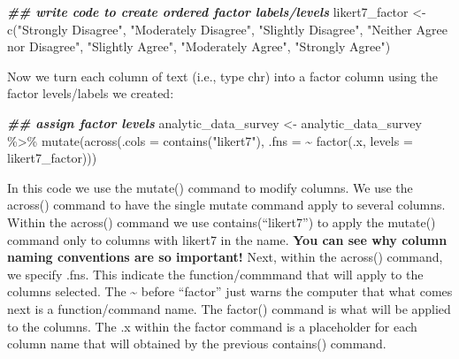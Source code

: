 \documentclass[
]{krantz}
\makeatletter
\newenvironment{Shaded}{\begin{snugshade}}{\end{snugshade}}
\newcommand{\AttributeTok}[1]{\textcolor[rgb]{0.61,0.61,0.61}{#1}}
\newcommand{\DocumentationTok}[1]{\textcolor[rgb]{0.37,0.37,0.37}{\textbf{\textit{#1}}}}
\newcommand{\FunctionTok}[1]{\textcolor[rgb]{0,0,0}{#1}}
\newcommand{\NormalTok}[1]{#1}
\newcommand{\OtherTok}[1]{\textcolor[rgb]{0.37,0.37,0.37}{#1}}
\newcommand{\SpecialCharTok}[1]{\textcolor[rgb]{0,0,0}{#1}}
\newcommand{\StringTok}[1]{\textcolor[rgb]{0.5,0.5,0.5}{#1}}
\newenvironment{kframe}{%
\medskip{}
\setlength{\fboxsep}{.8em}
 \def\at@end@of@kframe{}%
 \ifinner\ifhmode%
  \def\at@end@of@kframe{\end{minipage}}%
  \begin{minipage}{\columnwidth}%
 \fi\fi%
 \def\FrameCommand##1{\hskip\@totalleftmargin \hskip-\fboxsep
 \colorbox{shadecolor}{##1}\hskip-\fboxsep
     \hskip-\linewidth \hskip-\@totalleftmargin \hskip\columnwidth}%
 \MakeFramed {\advance\hsize-\width
   \@totalleftmargin\z@ \linewidth\hsize
   \@setminipage}}%
 {\par\unskip\endMakeFramed%
 \at@end@of@kframe}
\renewenvironment{Shaded}{\begin{kframe}}{\end{kframe}}
\makeatother
\begin{document}
\begin{Shaded}
\begin{Highlighting}[]
\DocumentationTok{\#\# write code to create ordered factor labels/levels}
\NormalTok{likert7\_factor }\OtherTok{\textless{}{-}} \FunctionTok{c}\NormalTok{(}\StringTok{"Strongly Disagree"}\NormalTok{,}
                    \StringTok{"Moderately Disagree"}\NormalTok{,}
                    \StringTok{"Slightly Disagree"}\NormalTok{,}
                    \StringTok{"Neither Agree nor Disagree"}\NormalTok{,}
                    \StringTok{"Slightly Agree"}\NormalTok{,}
                    \StringTok{"Moderately Agree"}\NormalTok{,}
                    \StringTok{"Strongly Agree"}\NormalTok{)}
\end{Highlighting}
\end{Shaded}

Now we turn each column of text (i.e., type chr) into a factor column using the factor levels/labels we created:

\begin{Shaded}
\begin{Highlighting}[]
\DocumentationTok{\#\# assign factor levels}
\NormalTok{analytic\_data\_survey }\OtherTok{\textless{}{-}}\NormalTok{ analytic\_data\_survey }\SpecialCharTok{\%\textgreater{}\%}
  \FunctionTok{mutate}\NormalTok{(}\FunctionTok{across}\NormalTok{(}\AttributeTok{.cols =} \FunctionTok{contains}\NormalTok{(}\StringTok{"likert7"}\NormalTok{), }
                \AttributeTok{.fns =} \SpecialCharTok{\textasciitilde{}} \FunctionTok{factor}\NormalTok{(.x, }\AttributeTok{levels =}\NormalTok{ likert7\_factor)))}
\end{Highlighting}
\end{Shaded}

In this code we use the mutate() command to modify columns. We use the across() command to have the single mutate command apply to several columns. Within the across() command we use contains(``likert7'') to apply the mutate() command only to columns with likert7 in the name. \textbf{You can see why column naming conventions are so important!} Next, within the across() command, we specify .fns. This indicate the function/commmand that will apply to the columns selected. The \textasciitilde{} before ``factor'' just warns the computer that what comes next is a function/command name. The factor() command is what will be applied to the columns. The .x within the factor command is a placeholder for each column name that will obtained by the previous contains() command.
\end{document}

